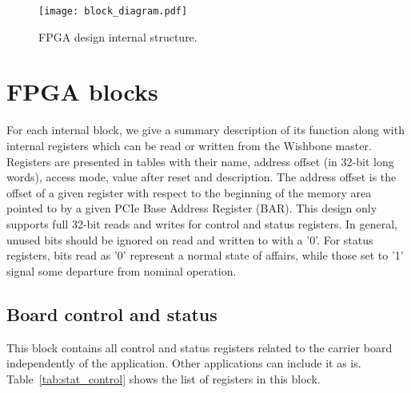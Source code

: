 \documentclass[a4paper]{article}
\begin{document}
\begin{figure}[htbp]
  \centering
  \texttt{[image: block\_diagram.pdf]}
  \caption{FPGA design internal structure.}
  \label{fig:block_diagram}
\end{figure}

\newpage

\section{FPGA blocks}
For each internal block, we give a summary description of its function along with internal registers which can be read or written from the Wishbone master. Registers are presented in tables with their name, address offset (in 32-bit long words), access mode, value after reset and description. The address offset is the offset of a given register with respect to the beginning of the memory area pointed to by a given PCIe Base Address Register (BAR). This design only supports full 32-bit reads and writes for control and status registers. In general, unused bits should be ignored on read and written to with a '0'. For status registers, bits read as '0' represent a normal state of affairs, while those set to '1' signal some departure from nominal operation.

\subsection{Board control and status}
This block contains all control and status registers related to the carrier board independently of the application. Other applications can include it as is. Table~\ref{tab:stat_control} shows the list of registers in this block.
\end{document}
